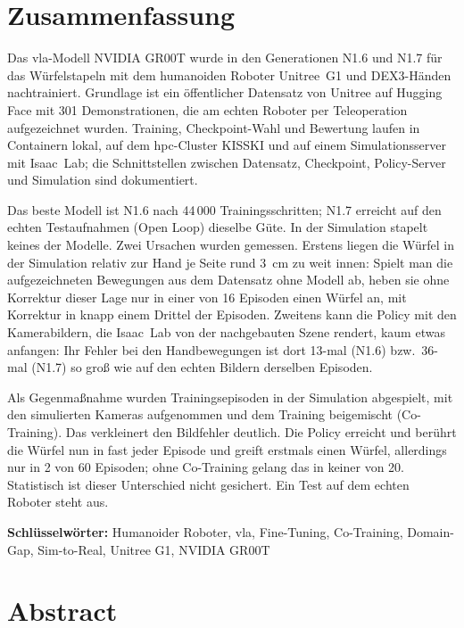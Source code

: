 
\chapter*{Zusammenfassung}

Das \ac{vla}-Modell NVIDIA GR00T wurde in den Generationen N1.6 und N1.7 für das Würfelstapeln
mit dem humanoiden Roboter Unitree~G1 und DEX3-Händen nachtrainiert. Grundlage ist ein
öffentlicher Datensatz von Unitree auf Hugging Face mit 301 Demonstrationen, die am echten
Roboter per Teleoperation aufgezeichnet wurden. Training, Checkpoint-Wahl und Bewertung laufen
in Containern lokal, auf dem \ac{hpc}-Cluster KISSKI und auf einem Simulationsserver mit
Isaac~Lab; die Schnittstellen zwischen Datensatz, Checkpoint, Policy-Server und Simulation sind
dokumentiert.

Das beste Modell ist N1.6 nach 44\,000 Trainingsschritten; N1.7 erreicht auf den echten
Testaufnahmen (Open Loop) dieselbe Güte. In der Simulation stapelt keines der Modelle. Zwei
Ursachen wurden gemessen. Erstens liegen die Würfel in der Simulation relativ zur Hand je Seite
rund 3~cm zu weit innen: Spielt man die aufgezeichneten Bewegungen aus dem Datensatz ohne
Modell ab, heben sie ohne Korrektur dieser Lage nur in einer von 16 Episoden einen Würfel an,
mit Korrektur in knapp einem Drittel der Episoden. Zweitens kann die Policy mit den Kamerabildern, die Isaac~Lab von der
nachgebauten Szene rendert, kaum etwas anfangen: Ihr Fehler bei den Handbewegungen ist dort
13-mal (N1.6) bzw.\ 36-mal (N1.7) so groß wie auf den echten Bildern derselben Episoden.

Als Gegenmaßnahme wurden Trainingsepisoden in der Simulation abgespielt, mit den simulierten
Kameras aufgenommen und dem Training beigemischt (Co-Training). Das verkleinert den Bildfehler
deutlich. Die Policy erreicht und berührt die Würfel nun in fast jeder Episode und greift
erstmals einen Würfel, allerdings nur in 2 von 60 Episoden; ohne Co-Training gelang das in
keiner von 20. Statistisch ist dieser Unterschied nicht gesichert. Ein Test auf dem echten
Roboter steht aus.

\bigskip
\noindent\textbf{Schlüsselwörter:}
Humanoider Roboter, \ac{vla}, Fine-Tuning, Co-Training, Domain-Gap, Sim-to-Real, Unitree G1,
NVIDIA GR00T

\vspace{2.0cm}

\chapter*{Abstract}

